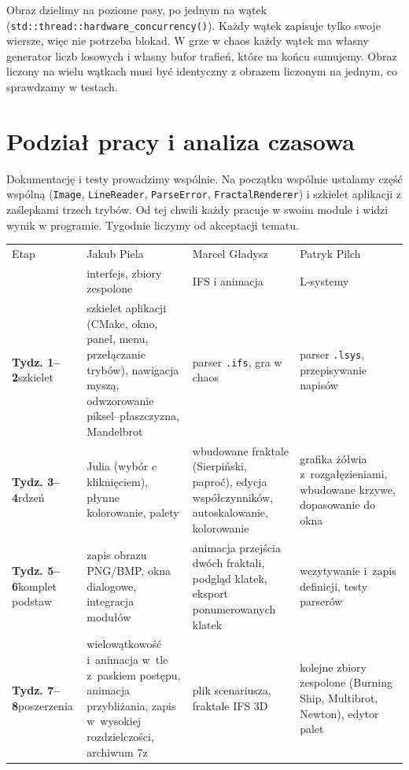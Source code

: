 \documentclass[11pt,a4paper]{article}
\newcommand{\kod}[1]{\texttt{#1}}
\begin{document}
Obraz dzielimy na poziome pasy, po jednym na wątek
(\kod{std::thread::hardware\_concurrency()}). Każdy wątek zapisuje tylko swoje
wiersze, więc nie potrzeba blokad. W grze w chaos każdy wątek ma własny
generator liczb losowych i własny bufor trafień, które na końcu sumujemy.
Obraz liczony na wielu wątkach musi być identyczny z obrazem liczonym na
jednym, co sprawdzamy w testach.

\section{Podział pracy i analiza czasowa}

Dokumentację i testy prowadzimy wspólnie. Na początku wspólnie ustalamy
część wspólną (\kod{Image}, \kod{LineReader}, \kod{ParseError},
\kod{FractalRenderer}) i szkielet aplikacji z zaślepkami trzech trybów.
Od tej chwili każdy pracuje w swoim module i widzi wynik w programie.
Tygodnie liczymy od akceptacji tematu.

\begin{center}
\renewcommand{\arraystretch}{1.25}
\begin{tabularx}{\textwidth}{@{}>{\raggedright\arraybackslash}p{2.2cm}
  >{\raggedright\arraybackslash}X >{\raggedright\arraybackslash}X
  >{\raggedright\arraybackslash}X@{}}
  \toprule
  Etap & Jakub Piela & Marcel Gładysz & Patryk Pilch \\
  & \footnotesize interfejs, zbiory zespolone & \footnotesize IFS i animacja
  & \footnotesize L-systemy \\
  \midrule
  \textbf{Tydz. 1--2}\newline szkielet &
    szkielet aplikacji (CMake, okno, panel, menu, przełączanie trybów), nawigacja myszą, odwzorowanie piksel--płaszczyzna, Mandelbrot &
    parser \kod{.ifs}, gra w chaos &
    parser \kod{.lsys}, przepisywanie napisów \\
  \textbf{Tydz. 3--4}\newline rdzeń &
    Julia (wybór $c$ kliknięciem), płynne kolorowanie, palety &
    wbudowane fraktale (Sierpiński, paproć), edycja współczynników, autoskalowanie, kolorowanie &
    grafika żółwia z~rozgałęzieniami, wbudowane krzywe, dopasowanie do okna \\
  \textbf{Tydz. 5--6}\newline komplet podstaw &
    zapis obrazu PNG/BMP, okna dialogowe, integracja modułów &
    animacja przejścia dwóch fraktali, podgląd klatek, eksport ponumerowanych klatek &
    wczytywanie i~zapis definicji, testy parserów \\
  \textbf{Tydz. 7--8}\newline poszerzenia &
    wielowątkowość i~animacja w~tle z~paskiem postępu, animacja przybliżania, zapis w~wysokiej rozdzielczości, archiwum 7z &
    plik scenariusza, fraktale IFS 3D &
    kolejne zbiory zespolone (Burning Ship, Multibrot, Newton), edytor palet \\
  \bottomrule
\end{tabularx}
\end{center}
\end{document}
